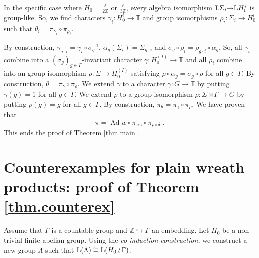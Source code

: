 \documentclass[a4paper,11pt]{amsart}
\numberwithin{equation}{section}
\begin{document}
In the specific case where $H_0 = \frac{\mathbb{Z}}{2{\mathbb{Z}}}$ or $\frac{\mathbb{Z}}{3{\mathbb{Z}}}$, every algebra isomorphism ${\mathord{\text{\rm L}}} \Sigma_i {\rightarrow} {\mathord{\text{\rm L}}} H_0^i$ is group-like. So, we find characters $\gamma_i : H_0^i {\rightarrow} {\mathbb{T}}$ and group isomorphisms $\rho_i : \Sigma_i {\rightarrow} H_0^i$ such that $\theta_i = \pi_{\gamma_i} \circ \pi_{\rho_i}$.

By construction, $\gamma_{g \cdot i} = \gamma_i \circ {\sigma}_g^{-1}$, ${\alpha}_g(\Sigma_i) = \Sigma_{g \cdot i}$ and $\sigma_g \circ \rho_i = \rho_{g \cdot i} \circ {\alpha}_g$. So, all $\gamma_i$ combine into a $({\sigma}_g)_{g \in \Gamma}$-invariant character $\gamma : H_0^{(I)} {\rightarrow} {\mathbb{T}}$ and all $\rho_i$ combine into an group isomorphism $\rho : \Sigma {\rightarrow} H_0^{(I)}$ satisfying $\rho \circ {\alpha}_g = {\sigma}_g \circ \rho$ for all $g \in \Gamma$. By construction, $\theta = \pi_\gamma \circ \pi_\rho$. We extend $\gamma$ to a character $\gamma : G {\rightarrow} {\mathbb{T}}$ by putting $\gamma(g) = 1$ for all $g \in \Gamma$. We extend $\rho$ to a group isomorphism $\rho : \Sigma \rtimes \Gamma {\rightarrow} G$ by putting $\rho(g) = g$ for all $g \in \Gamma$. By construction, $\pi_\theta = \pi_\gamma \circ \pi_\rho$. We have proven that
$$\pi = {\operatorname{Ad}} w \circ \pi_{{\omega} \, \gamma} \circ \pi_{\rho \circ \delta} \; .$$
This ends the proof of Theorem \ref{thm.main}.\hfill\qedsymbol

\section{Counterexamples for plain wreath products: proof of Theorem \ref{thm.counterex}} \label{sec.counterex}

Assume that $\Gamma$ is a countable group and ${\mathbb{Z}} \hookrightarrow \Gamma$ an embedding. Let $H_0$ be a non-trivial finite abelian group. Using the \emph{co-induction construction,} we construct a new group $\Lambda$ such that ${\mathord{\text{\rm L}}} (\Lambda) \cong {\mathord{\text{\rm L}}} (H_0 \wr \Gamma)$.
\end{document}
